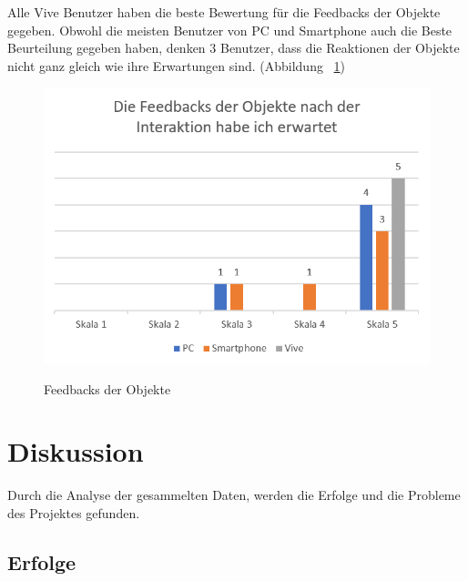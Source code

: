 Alle Vive Benutzer haben die beste Bewertung für die Feedbacks der Objekte gegeben. Obwohl die meisten Benutzer von PC und Smartphone auch die Beste Beurteilung gegeben haben, denken 3 Benutzer, dass die Reaktionen der Objekte nicht ganz gleich wie ihre Erwartungen sind. (Abbildung ~\ref{fig:feedbacksDerObjekte})

\begin{figure}[ht]
\vspace*{1em}
\centering
\caption{Feedbacks der Objekte}
\includegraphics[width= \textwidth]{images/feedbacksDerObjekte.png}
\label{fig:feedbacksDerObjekte} 
\end{figure}

\section{Diskussion}

Durch die Analyse der gesammelten Daten, werden die Erfolge und die Probleme des Projektes gefunden.

\subsection{Erfolge}

